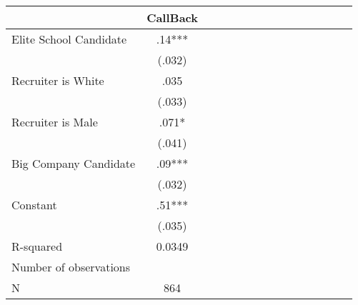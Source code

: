 \begin{tabular}{l*{14}{c}}
                    &    CallBack   \\
\hline
Elite School Candidate&         .14***\\
                    &      (.032)   \\
Recruiter is White  &        .035   \\
                    &      (.033)   \\
Recruiter is Male   &        .071*  \\
                    &      (.041)   \\
Big Company Candidate&         .09***\\
                    &      (.032)   \\
Constant            &         .51***\\
                    &      (.035)   \\
\hline
R-squared           &      0.0349   \\
Number of observations&               \\
N                   &         864   \\
\end{tabular}
